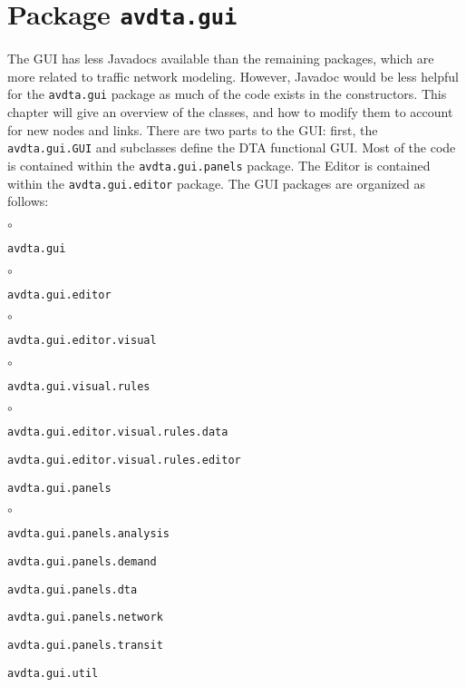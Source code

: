 \chapter{Package \texttt{avdta.gui}}

The GUI has less Javadocs available than the remaining packages, which are more related to traffic network modeling. However, Javadoc would be less helpful for the \texttt{avdta.gui} package as much of the code exists in the constructors. This chapter will give an overview of the classes, and how to modify them to account for new nodes and links. There are two parts to the GUI: first, the \texttt{avdta.gui.GUI} and subclasses define the DTA functional GUI. Most of the code is contained within the \texttt{avdta.gui.panels} package. The Editor is contained within the \texttt{avdta.gui.editor} package. 
%
The GUI packages are organized as follows:
\begin{list}{$\circ$}{}
	\item \texttt{avdta.gui}
	
	\begin{list}{$\circ$}{}
		\item \texttt{avdta.gui.editor}
		
		\begin{list}{$\circ$}{}
			\item \texttt{avdta.gui.editor.visual}
			
			\begin{list}{$\circ$}{}
				\item \texttt{avdta.gui.visual.rules}
				
				\begin{list}{$\circ$}{}
					\item \texttt{avdta.gui.editor.visual.rules.data}
					\item \texttt{avdta.gui.editor.visual.rules.editor}
				\end{list}
			\end{list}
		\end{list}
		
		\item \texttt{avdta.gui.panels}
		
		\begin{list}{$\circ$}{}
			\item \texttt{avdta.gui.panels.analysis}
			\item \texttt{avdta.gui.panels.demand}
			\item \texttt{avdta.gui.panels.dta}
			\item \texttt{avdta.gui.panels.network}
			\item \texttt{avdta.gui.panels.transit}
		\end{list}
		
		\item \texttt{avdta.gui.util}
	\end{list}
	
\end{list}

